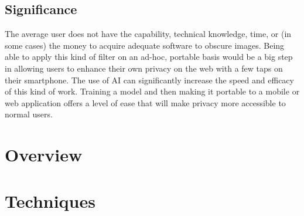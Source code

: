 \documentclass{article}
\newcommand{\nocontentsline}[3]{}
\newcommand{\tocless}[2]{\bgroup\let\addcontentsline=\nocontentsline#1{#2}\egroup}
\begin{document}
  \tocless\subsection{Significance}
  The average user does not have the capability, technical knowledge, time, or (in some cases) the money to acquire adequate software to obscure images.
  Being able to apply this kind of filter on an ad-hoc, portable basis would be a big step in allowing users to enhance their own privacy on the web with a few taps on their smartphone.
  The use of AI can significantly increase the speed and efficacy of this kind of work.
  Training a model and then making it portable to a mobile or web application offers a level of ease that will make privacy more accessible to normal users.
  
  \tocless\subsection{Challenges}
  
  
  
  \tocless\subsection{Objectives}
  \newpage
  \section{Overview}
  \tocless\subsection{History of the problem}
  \tocless\subsection{State of the art}
  \newpage
  \section{Techniques}
  \tocless\subsection{Principles, Concepts, and Theoretical Foundations of the research problem}
  \tocless\subsection{Techniques that have been used by other researchers for the research problem}
  \tocless\subsection{Relevant technologies that would be useful to this research}
  \newpage
\end{document}
